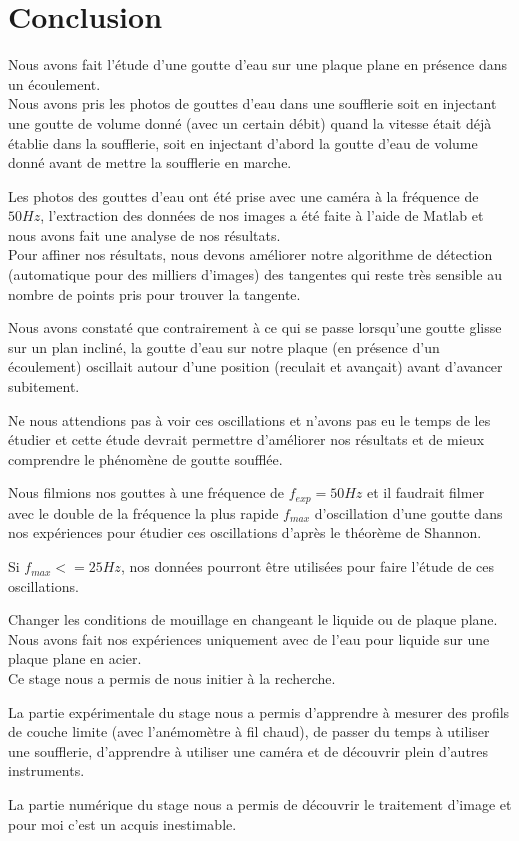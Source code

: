 \documentclass[french]{article}
\begin{document}
\section*{Conclusion}

Nous avons fait l'étude d'une goutte d'eau sur une plaque plane en présence dans un écoulement.\\

Nous avons pris les photos de gouttes d'eau dans une soufflerie soit en injectant une goutte de volume donné (avec un certain débit) quand la vitesse était déjà établie dans la soufflerie, soit en injectant d'abord la goutte d'eau de volume donné avant de mettre la soufflerie en marche.

Les photos des gouttes d'eau ont été prise avec une caméra à la fréquence de $50Hz$, l'extraction des données de nos images a été faite à l'aide de Matlab et nous avons fait une analyse de nos résultats.\\


Pour affiner nos résultats, nous devons améliorer notre algorithme de détection (automatique pour des milliers d'images) des tangentes qui reste très sensible au nombre de points pris pour trouver la tangente.

Nous avons constaté que contrairement à ce qui se passe lorsqu'une goutte glisse sur un plan incliné, 
la goutte d'eau sur notre plaque (en présence d'un écoulement) oscillait autour d'une position (reculait et avançait) avant d'avancer subitement.

Ne nous attendions pas à voir ces oscillations et n'avons pas eu le temps de les étudier et cette étude devrait permettre d'améliorer nos résultats et de mieux comprendre le phénomène de goutte soufflée.

Nous filmions nos gouttes à une fréquence de $f_{exp} = 50Hz$ et il faudrait filmer avec le double de la fréquence la plus rapide $f_{max}$ d'oscillation d'une goutte dans nos expériences  pour étudier ces oscillations d'après le théorème de Shannon.

Si $f_{max} <= 25 Hz$, nos données pourront être utilisées pour faire l'étude de ces oscillations.


Changer les conditions de mouillage en changeant le liquide ou de plaque plane. Nous avons fait nos expériences uniquement avec de l'eau pour liquide sur une plaque plane en acier. \\

Ce stage nous a permis de nous initier à la recherche.

La partie expérimentale du stage nous a  permis d'apprendre à mesurer des profils de couche limite (avec l'anémomètre à fil chaud), de passer du temps à utiliser une soufflerie, d'apprendre à utiliser une caméra et de découvrir plein d'autres instruments.

La partie numérique du stage nous a permis de découvrir le traitement d'image et pour moi c'est un acquis inestimable.
\end{document}
